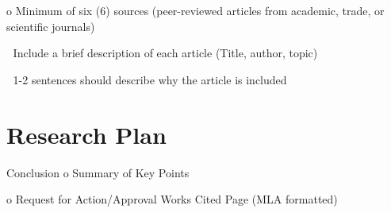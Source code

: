 \documentclass[letterpaper,11pt]{texMemo}
\begin{document}
    o Minimum of six (6) sources (peer-reviewed articles from academic, trade, or
    scientific journals)

         Include a brief description of each article (Title, author, topic)

         1-2 sentences should describe why the article is included

\section{Research Plan}
Conclusion
    o Summary of Key Points

    o Request for Action/Approval
    Works Cited Page (MLA formatted)
\end{document}
